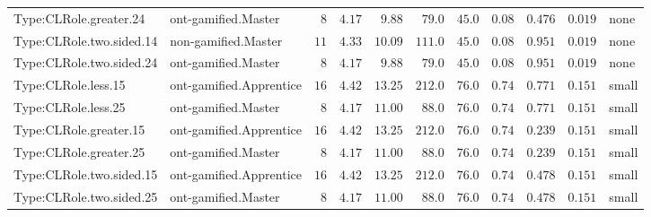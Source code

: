 \documentclass[6pt,a4paper]{article}
\begin{document}
{\begin{longtable}{llrrrrrrrrl}
Type:CLRole.greater.24&ont-gamified.Master&$ 8$&$4.17$&$ 9.88$&$ 79.0$&$ 45.0$&$ 0.08$&$0.476$&$0.019$&none\tabularnewline
Type:CLRole.two.sided.14&non-gamified.Master&$11$&$4.33$&$10.09$&$111.0$&$ 45.0$&$ 0.08$&$0.951$&$0.019$&none\tabularnewline
Type:CLRole.two.sided.24&ont-gamified.Master&$ 8$&$4.17$&$ 9.88$&$ 79.0$&$ 45.0$&$ 0.08$&$0.951$&$0.019$&none\tabularnewline
Type:CLRole.less.15&ont-gamified.Apprentice&$16$&$4.42$&$13.25$&$212.0$&$ 76.0$&$ 0.74$&$0.771$&$0.151$&small\tabularnewline
Type:CLRole.less.25&ont-gamified.Master&$ 8$&$4.17$&$11.00$&$ 88.0$&$ 76.0$&$ 0.74$&$0.771$&$0.151$&small\tabularnewline
Type:CLRole.greater.15&ont-gamified.Apprentice&$16$&$4.42$&$13.25$&$212.0$&$ 76.0$&$ 0.74$&$0.239$&$0.151$&small\tabularnewline
Type:CLRole.greater.25&ont-gamified.Master&$ 8$&$4.17$&$11.00$&$ 88.0$&$ 76.0$&$ 0.74$&$0.239$&$0.151$&small\tabularnewline
\newpage
Type:CLRole.two.sided.15&ont-gamified.Apprentice&$16$&$4.42$&$13.25$&$212.0$&$ 76.0$&$ 0.74$&$0.478$&$0.151$&small\tabularnewline
Type:CLRole.two.sided.25&ont-gamified.Master&$ 8$&$4.17$&$11.00$&$ 88.0$&$ 76.0$&$ 0.74$&$0.478$&$0.151$&small\tabularnewline
\hline
\end{longtable}}
\end{document}
